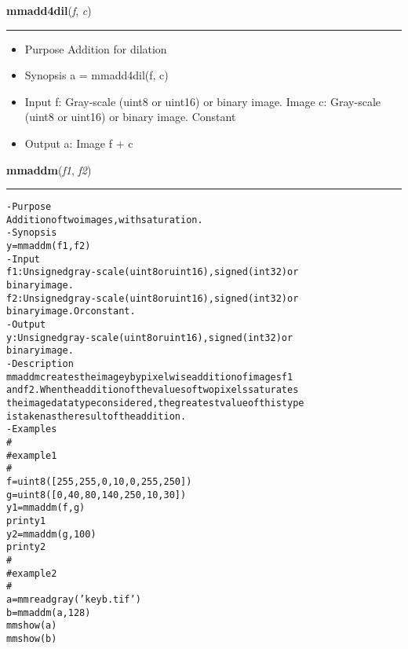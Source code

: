     \begin{boxedminipage}{\textwidth}

    \raggedright \textbf{mmadd4dil}(\textit{f}, \textit{c})

    \vspace{-1.5ex}

    \rule{\textwidth}{0.5\fboxrule}
    \begin{itemize}
    \setlength{\parskip}{0.6ex}
      \item Purpose Addition for dilation

      \item Synopsis a = mmadd4dil(f, c)

      \item Input f: Gray-scale (uint8 or uint16) or binary image. Image c: 
        Gray-scale (uint8 or uint16) or binary image. Constant

      \item Output a: Image f + c

    \end{itemize}

    \vspace{1ex}

    \end{boxedminipage}

    \label{multireg:num_pymorph:mmaddm}
    \vspace{0.5ex}

    \begin{boxedminipage}{\textwidth}

    \raggedright \textbf{mmaddm}(\textit{f1}, \textit{f2})

    \vspace{-1.5ex}

    \rule{\textwidth}{0.5\fboxrule}
\begin{alltt}
- Purpose
    Addition of two images, with saturation.
- Synopsis
    y = mmaddm(f1, f2)
- Input
    f1: Unsigned gray-scale (uint8 or uint16), signed (int32) or
        binary image.
    f2: Unsigned gray-scale (uint8 or uint16), signed (int32) or
        binary image. Or constant.
- Output
    y: Unsigned gray-scale (uint8 or uint16), signed (int32) or
       binary image.
- Description
    mmaddm creates the image y by pixelwise addition of images f1
    and f2 . When the addition of the values of two pixels saturates
    the image data type considered, the greatest value of this type
    is taken as the result of the addition.
- Examples
    \#
    \#   example 1
    \#
    f = uint8([255,   255,    0,   10,    0,   255,   250])
    g = uint8([ 0,    40,   80,   140,  250,    10,    30])
    y1 = mmaddm(f,g)
    print y1
    y2 = mmaddm(g, 100)
    print y2
    \#
    \#   example 2
    \#
    a = mmreadgray('keyb.tif')
    b = mmaddm(a,128)
    mmshow(a)
    mmshow(b)\end{alltt}

    \vspace{1ex}

    \end{boxedminipage}

